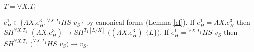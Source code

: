\begin{case}
\begin{subcase}
\end{subcase}

\begin{subcase}

$T=\forall X.T_{1}$

$e_{H}^{1}\in\lbrace\Lambda X.e_{H}^{3},{^{\forall X.T_{1}}H}S$ $v_{S}\rbrace$ by canonical forms (Lemma \ref{cf}).  If $e_{H}^{1}=\Lambda X.e_{H}^{3}$ then $SH^{\forall X.T_{1}}$ $(\Lambda X.e_{H}^{3})\rightarrow SH^{T_{1}[L/X]}$ $((\Lambda X.e_{H}^{3})$ $\lbrace L\rbrace)$.  If $e_{H}^{1}={^{\forall X.T_{1}}H}S$ $v_{S}$ then $SH^{\forall X.T_{1}}$ $(^{\forall X.T_{1}}HS$ $v_{S})\rightarrow v_{S}$.

\end{subcase}

\end{case}